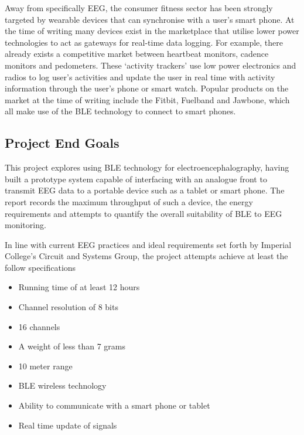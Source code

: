 \documentclass[]{article}
\begin{document}
Away from specifically \ac{EEG}, the consumer fitness sector has been strongly targeted by wearable devices that can synchronise with a user's smart phone. At the time of writing many devices exist in the marketplace that utilise lower power technologies to act as gateways for real-time data logging. For example, there already exists a competitive market between heartbeat monitors, cadence monitors and pedometers. These ‘activity trackers’ use low power electronics and radios to log user's activities and update the user in real time with activity information through the user's phone or smart watch. Popular products on the market at the time of writing include the Fitbit, Fuelband and Jawbone, which all make use of the \ac{BLE} technology to connect to smart phones.

\subsection{Project End Goals}

 This project explores using \ac{BLE} technology for electroencephalography, having built a prototype system capable of interfacing with an analogue front to transmit \ac{EEG} data to a portable device such as a tablet or smart phone.  The report records the maximum throughput of such a device, the energy requirements and attempts to quantify the overall suitability of \ac{BLE} to \ac{EEG} monitoring.

In line with current \ac{EEG} practices and ideal requirements set forth by Imperial College's Circuit and Systems Group, the project attempts achieve at least the follow specifications
\begin{itemize}
	\item Running time of at least 12 hours
	\item Channel resolution of 8 bits 
	\item 16 channels
	\item A weight of less than 7 grams
	\item 10 meter range
	\item BLE wireless technology
	\item Ability to communicate with a smart phone or tablet
	\item Real time update of signals
\end{itemize}
\end{document}

